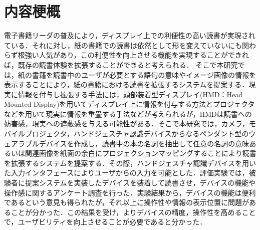 \section*{内容梗概}

電子書籍リーダの普及により，ディスプレイ上での利便性の高い読書が実現されている．それに対し，紙の書籍での読書は依然として形を変えていないにも関わらず根強い人気があり，この利便性を向上させる機能を実現することができれば，既存の読書体験を拡張することができると考えられる．
そこで本研究では，紙の書籍を読書中のユーザが必要とする語句の意味やイメージ画像の情報を表示することにより，紙の書籍における読書を拡張するシステムを提案する．現実に情報を付与し拡張する手法には，頭部装着型ディスプレイ(HMD：Head Mounted Display)を用いてディスプレイ上に情報を付与する方法とプロジェクタなどを用いて現実に情報を重畳する手法などが考えられるが，HMDは読書への妨害感，現実への遮蔽感を与える可能性がある．そこで本研究では，カメラ，モバイルプロジェクタ，ハンドジェスチャ認識デバイスからなるペンダント型のウェアラブルデバイスを作成し，読書中の本の名詞を抽出して任意の名詞の意味あるいは関連画像を紙面の余白にプロジェクションマッピングすることにより読書を拡張するシステムを提案する．その際，ハンドジェスチャ認識デバイスを用いた入力インタフェースによりユーザからの入力を可能とした．評価実験では，被験者に提案システムを実装したデバイスを装着して読書させ，デバイスの機能や操作感に関するアンケート調査を行った．実験結果から，デバイスの機能は便利であるという意見も得られたが，それ以上に操作性や情報の表示位置に問題があることが分かった．この結果を受け，よりデバイスの精度，操作性を高めることで，ユーザビリティを向上させることが必要であると分かった．


